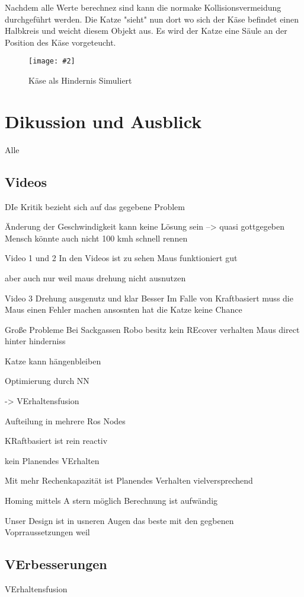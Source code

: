 \documentclass[
a4paper,     %
12pt         %
]{scrartcl}  %
\newcommand{\mygraphics}[3]{
\begin{figure}[!h]
  \begin{center}
    \texttt{[image: \#2]} \\
    \caption{#3}\label{fig:#2}
  \end{center}
\end{figure}

}
\begin{document}
Nachdem alle Werte berechnez sind kann die normake Kollisionsvermeidung durchgeführt werden. Die Katze "sieht" nun dort wo sich der Käse befindet einen Halbkreis und weicht diesem Objekt aus. Es wird der Katze eine Säule an der Position des Käse vorgeteucht.
\mygraphics{0.5\textwidth}{collisionCHEESE.png}{Käse als Hindernis Simuliert}


\section{Dikussion und Ausblick}
Alle
\subsection{Videos}

DIe Kritik bezieht sich auf das gegebene Problem

Änderung der Geschwindigkeit kann keine Lösung sein --> quasi gottgegeben
Mensch könnte auch nicht 100 kmh schnell rennen

Video 1 und 2
In den Videos ist zu sehen Maus funktioniert gut

aber auch nur weil maus drehung nicht ausnutzen

Video 3
Drehung ausgenutz und klar Besser
Im Falle von Kraftbasiert muss die Maus einen Fehler machen ansosnten hat die Katze keine Chance


Große Probleme Bei Sackgassen
Robo besitz kein REcover verhalten
Maus direct hinter hinderniss

Katze kann hängenbleiben

Optimierung durch NN

-> VErhaltensfusion

Aufteilung in mehrere Ros Nodes

KRaftbasiert ist rein reactiv

kein Planendes VErhalten

Mit mehr Rechenkapazität ist Planendes Verhalten vielversprechend


Homing mittels A stern möglich
Berechnung ist aufwändig

Unser Design ist in usneren Augen das beste mit den gegbenen Voprraussetzungen weil




\subsection{VErbesserungen}

VErhaltensfusion
\end{document}
